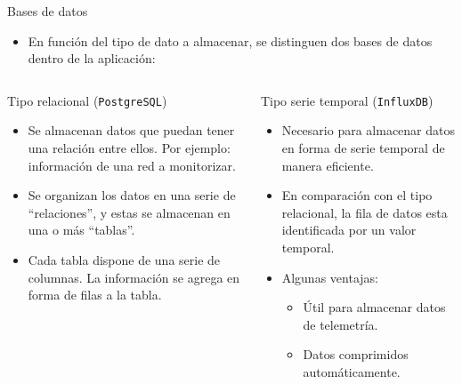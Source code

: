 \documentclass[aspectratio=169,xcolor=dvipsnames]{beamer}
\begin{document}
	
	\begin{frame}{Bases de datos}
		
		\begin{itemize}
			\item En función del tipo de dato a almacenar, se distinguen dos bases de datos dentro de la aplicación:
		\end{itemize}
		
		\begin{columns}
			\begin{column}{0.5\textwidth}
				\begin{block}{Tipo relacional (\texttt{PostgreSQL})}
					\begin{itemize}
						\item Se almacenan datos que puedan tener una relación entre ellos. Por ejemplo: información de una red a monitorizar.
						
						\item Se organizan los datos en una serie de ``relaciones'', y estas se almacenan en una o más ``tablas''.
						
						\item Cada tabla dispone de una serie de columnas. La información se agrega en forma de filas a la tabla.
					\end{itemize}
				\end{block}
			\end{column}
			
			
			\begin{column}{0.5\textwidth}
				\begin{block}{Tipo serie temporal (\texttt{InfluxDB})}
					\begin{itemize}
						\item Necesario para almacenar datos en forma de serie temporal de manera eficiente.
						
						\item En comparación con el tipo relacional, la fila de datos esta identificada por un valor temporal.
						
						\item Algunas ventajas:
						\begin{itemize}
							\item Útil para almacenar datos de telemetría.
							\item Datos comprimidos automáticamente.
						\end{itemize}
					\end{itemize}
				\end{block}
			\end{column}
		\end{columns}
	\end{frame}
	
\end{document}
